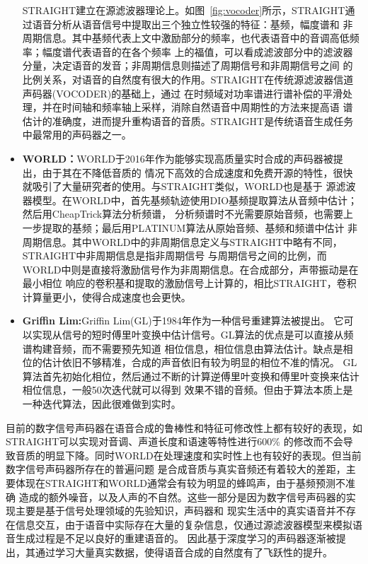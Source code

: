 \begin{itemize}
    STRAIGHT建立在源滤波器理论上。如图~\ref{fig:vocoder}所示，STRAIGHT通过语音分析从语音信号中提取出三个独立性较强的特征：基频，幅度谱和
    非周期信息。其中基频代表上文中激励部分的频率，也代表语音中的音调高低频率；幅度谱代表语音的在各个频率
    上的福值，可以看成滤波部分中的滤波器分量，决定语音的发音；非周期信息则描述了周期信号和非周期信号之间
    的比例关系，对语音的自然度有很大的作用。STRAIGHT在传统源滤波器信道声码器(VOCODER)的基础上，通过
    在时频域对功率谱进行谱补偿的平滑处理，并在时间轴和频率轴上采样，消除自然语音中周期性的方法来提高语
    谱估计的准确度，进而提升重构语音的音质\cite{杨骋基于简化}。STRAIGHT是传统语音生成任务中最常用的声码器之一。
    \item \textbf{WORLD：}WORLD于2016年作为能够实现高质量实时合成的声码器被提出，由于其在不降低音质的
    情况下高效的合成速度和免费开源的特性，很快就吸引了大量研究者的使用\cite{morise2016world}。与STRAIGHT类似，WORLD也是基于
    源滤波器模型。在WORLD中，首先基频轨迹使用DIO基频提取算法从音频中估计；然后用CheapTrick算法分析频谱，
    分析频谱时不光需要原始音频，也需要上一步提取的基频；最后用PLATINUM算法从原始音频、基频和频谱中估计
    非周期信息。其中WORLD中的非周期信息定义与STRAIGHT中略有不同，STRAIGHT中非周期信息是指非周期信号
    与周期信号之间的比例，而WORLD中则是直接将激励信号作为非周期信息。在合成部分，声带振动是在最小相位
    响应的卷积基和提取的激励信号上计算的，相比STRAIGHT，卷积计算量更小，使得合成速度也会更快。
    \item \textbf{Griffin Lim:}Griffin Lim(GL)于1984年作为一种信号重建算法被提出\cite{griffin1984signal}。
    它可以实现从信号的短时傅里叶变换中估计信号。GL算法的优点是可以直接从频谱构建音频，而不需要预先知道
    相位信息，相位信息由算法估计。缺点是相位的估计依旧不够精准，合成的声音依旧有较为明显的相位不准的情况。
    GL算法首先初始化相位，然后通过不断的计算逆傅里叶变换和傅里叶变换来估计相位信息，一般50次迭代就可以得到
    效果不错的音频。但由于算法本质上是一种迭代算法，因此很难做到实时。
\end{itemize}

目前的数字信号声码器在语音合成的鲁棒性和特征可修改性上都有较好的表现，如STRAIGHT可以实现对音调、声道长度和语速等特性进行600\%
的修改而不会导致音质的明显下降。同时WORLD在处理速度和实时性上也有较好的表现。但当前数字信号声码器所存在的普遍问题
是合成音质与真实音频还有着较大的差距，主要体现在STRAIGHT和WORLD通常会有较为明显的蜂鸣声，由于基频预测不准确
造成的额外噪音，以及人声的不自然。这些一部分是因为数字信号声码器的实现主要是基于信号处理领域的先验知识，声码器和
现实生活中的真实语音并不存在信息交互，由于语音中实际存在大量的复杂信息，仅通过源滤波器模型来模拟语音生成过程是不足以良好的重建语音的。
因此基于深度学习的声码器逐渐被提出，其通过学习大量真实数据，使得语音合成的自然度有了飞跃性的提升。

